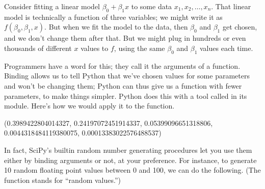\documentclass[letterpaper,10pt,english]{sphinxmanual}
\begin{document}
  Consider fitting a linear model \(\beta_0+\beta_1x\) to some data \(x_1,x_2,\ldots,x_n\).  That linear model is technically a function of three variables; we might write it as \(f(\beta_0,\beta_1,x)\).  But when we fit the model to the data, then \(\beta_0\) and \(\beta_1\) get chosen, and we don’t change them after that.  But we might plug in hundreds or even thousands of different \(x\) values to \(f\), using the same \(\beta_0\) and \(\beta_1\) values each time.

Programmers have a word for this; they call it  the arguments of a function.  Binding allows us to tell Python that we’ve chosen values for some parameters and won’t be changing them; Python can thus give us a function with fewer parameters, to make things simpler.  Python does this with a tool called  in its  module.  Here’s how we would apply it to the  function.

\begin{sphinxVerbatim}[commandchars=\\\{\}]
   

      

              
\end{sphinxVerbatim}

\begin{sphinxVerbatim}[commandchars=\\\{\}]
(0.3989422804014327,
 0.24197072451914337,
 0.05399096651318806,
 0.0044318484119380075,
 0.00013383022576488537)
\end{sphinxVerbatim}

In fact, SciPy’s built\sphinxhyphen{}in random number generating procedures let you use them either by binding arguments or not, at your preference.  For instance, to generate 10 random floating point values between 0 and 100, we can do the following.  (The  function stands for “random values.”)
\end{document}
